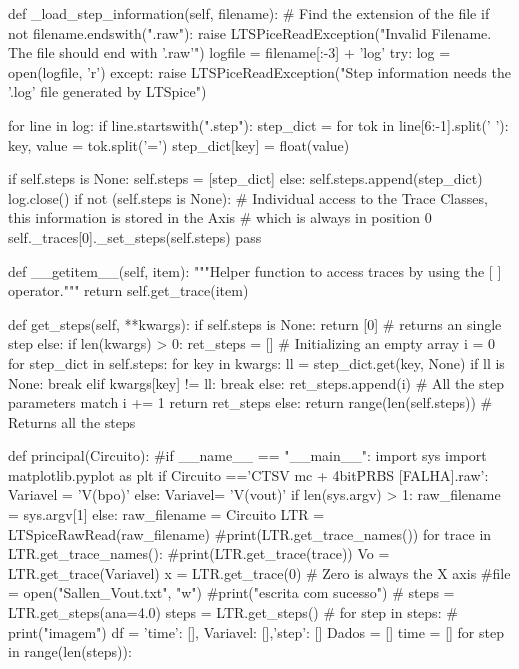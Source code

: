     def _load_step_information(self, filename):
        # Find the extension of the file
        if not filename.endswith(".raw"):
            raise LTSPiceReadException("Invalid Filename. The file should end with '.raw'")
        logfile = filename[:-3] + 'log'
        try:
            log = open(logfile, 'r')
        except:
            raise LTSPiceReadException("Step information needs the '.log' file generated by LTSpice")

        for line in log:
            if line.startswith(".step"):
                step_dict = {}
                for tok in line[6:-1].split(' '):
                    key, value = tok.split('=')
                    step_dict[key] = float(value)

                if self.steps is None:
                    self.steps = [step_dict]
                else:
                    self.steps.append(step_dict)
        log.close()
        if not (self.steps is None):
            # Individual access to the Trace Classes, this information is stored in the Axis
            # which is always in position 0
            self._traces[0]._set_steps(self.steps)
            pass

    def __getitem__(self, item):
        """Helper function to access traces by using the [ ] operator."""
        return self.get_trace(item)

    def get_steps(self, **kwargs):
        if self.steps is None:
            return [0]  # returns an single step
        else:
            if len(kwargs) > 0:
                ret_steps = []  # Initializing an empty array
                i = 0
                for step_dict in self.steps:
                    for key in kwargs:
                        ll = step_dict.get(key, None)
                        if ll is None:
                            break
                        elif kwargs[key] != ll:
                            break
                    else:
                        ret_steps.append(i)  # All the step parameters match
                    i += 1
                return ret_steps
            else:
                return range(len(self.steps))  # Returns all the steps


def principal(Circuito):
#if __name__ == "__main__":
    import sys
    import matplotlib.pyplot as plt
    if Circuito =='CTSV mc + 4bitPRBS [FALHA].raw':
        Variavel = 'V(bpo)'
    else:
        Variavel= 'V(vout)'
    if len(sys.argv) > 1:
        raw_filename = sys.argv[1]
    else:
        raw_filename = Circuito
    LTR = LTSpiceRawRead(raw_filename)
    #print(LTR.get_trace_names())
    for trace in LTR.get_trace_names():
        #print(LTR.get_trace(trace))
        Vo = LTR.get_trace(Variavel)
        x = LTR.get_trace(0)  # Zero is always the X axis
        #file = open("Sallen_Vout.txt", "w")
        #print("escrita com sucesso")
        # steps = LTR.get_steps(ana=4.0)
        steps = LTR.get_steps()
        # for step in steps:
       # print("imagem")
        df = {'time': [], Variavel: [],'step': []}
        Dados = []
        time = []
        for step in range(len(steps)):

